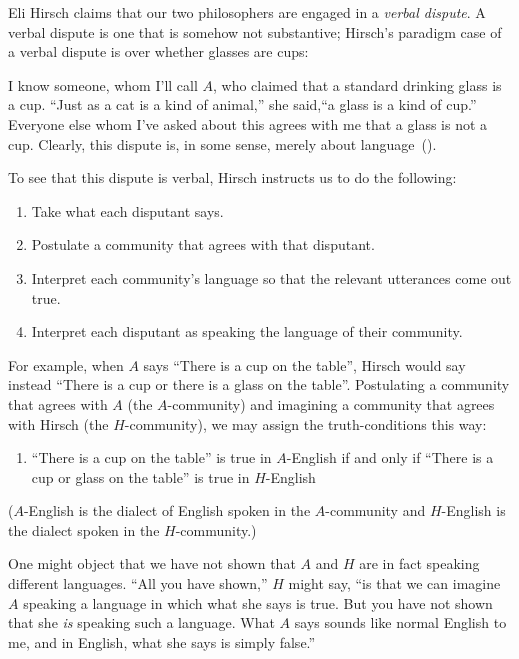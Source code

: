 \documentclass[12pt,twoside]{reedfancy}
\newenvironment{squote}{%
	\begin{spacing}{1}
	\begin{list}{}{%
	\setlength{\labelwidth}{0pt}%
	\rightmargin\leftmargin%
	}
	\item\relax
	}{%
	\end{list}%
	\end{spacing}
	}
\begin{document}
\begin{spacing}{1.25}
Eli Hirsch claims that our two philosophers are engaged in a {\em
  verbal dispute}.  A verbal dispute is one that is somehow not
substantive; Hirsch's paradigm case of a verbal dispute is over
whether glasses are cups:

\begin{squote}
  I know someone, whom I'll call $A$, who claimed that a standard
  drinking glass is a cup.  ``Just as a cat is a kind of animal,'' she
  said,``a glass is a kind of cup.''  Everyone else whom I've asked
  about this agrees with me that a glass is not a cup.  Clearly, this
  dispute is, in some sense, merely about
  language~(\citeyear[69]{hirsch2005}).
\end{squote}

To see that this dispute is verbal, Hirsch instructs us to do the
following:

\begin{enumerate}
  \item Take what each disputant says.
  \item Postulate a community that agrees with that disputant.
  \item Interpret each community's language so that the relevant
    utterances come out true.
  \item Interpret each disputant as speaking the language of their
    community.
\end{enumerate}

For example, when $A$ says ``There is a cup on the table'', Hirsch
would say instead ``There is a cup or there is a glass on the table''.
Postulating a community that agrees with $A$ (the $A$-community) and
imagining a community that agrees with Hirsch (the $H$-community), we
may assign the truth-conditions this way:
\begin{enumerate}[itemindent=25pt, label=(T)]
    \item ``There is a cup on the table'' is true in $A$-English if
      and only if ``There is a cup or glass on the table'' is true in
      $H$-English
\end{enumerate}
($A$-English is the dialect of English spoken in the $A$-community and
$H$-English is the dialect spoken in the $H$-community.)

One might object that we have not shown that $A$ and $H$ are in fact
speaking different languages.  ``All you have shown,'' $H$ might say,
``is that we can imagine $A$ speaking a language in which what she
says is true.  But you have not shown that she {\em is} speaking such
a language.  What $A$ says sounds like normal English to me, and in
English, what she says is simply false.''


\end{spacing}
\end{document}
